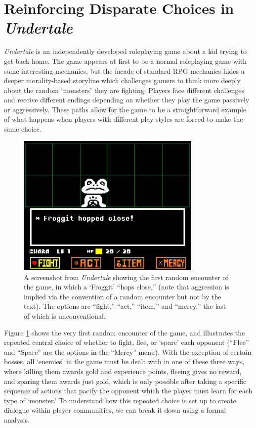 \documentclass[arts,article,submit,moreauthors,pdftex,10pt,a4paper]{Definitions/mdpi}
\begin{document}
\section{Reinforcing Disparate Choices in \emph{Undertale}}

\emph{Undertale} is an independently developed roleplaying game \citep{fox2015undertale} about a kid trying to get back home.
%
The game appears at first to be a normal roleplaying game with some interesting mechanics, but the facade of standard RPG mechanics hides a deeper morality-based storyline which challenges gamers to think more deeply about the random `monsters' they are fighting.
%
Players face different challenges and receive different endings depending on whether they play the game passively or aggressively.
%
These paths allow for the game to be a straightforward example of what happens when players with different play styles are forced to make the same choice.

\begin{figure}[t]
  \centering
    \includegraphics[width=0.8\textwidth]{fig/froggit.png}
    \caption{A screenshot from \emph{Undertale} showing the first random encounter of the game, in which a `Froggit' ``hops close,'' (note that aggression is implied via the convention of a random encounter but not by the text). The options are ``fight,'' ``act,'' ``item,'' and ``mercy,'' the last of which is unconventional.}
    \label{fig:UT_froggit}
\end{figure}

Figure \ref{fig:UT_froggit} shows the very first random encounter of the game, and illustrates the repeated central choice of whether to fight, flee, or `spare' each opponent (``Flee'' and ``Spare'' are the options in the ``Mercy'' menu).
%
With the exception of certain bosses, all `enemies' in the game must be dealt with in one of these three ways, where killing them awards gold and experience points, fleeing gives no reward, and sparing them awards just gold, which is only possible after taking a specific sequence of actions that pacify the opponent which the player must learn for each type of `monster.'
%
To understand how this repeated choice is set up to create dialogue within player communities, we can break it down using a formal analysis.
\end{document}
